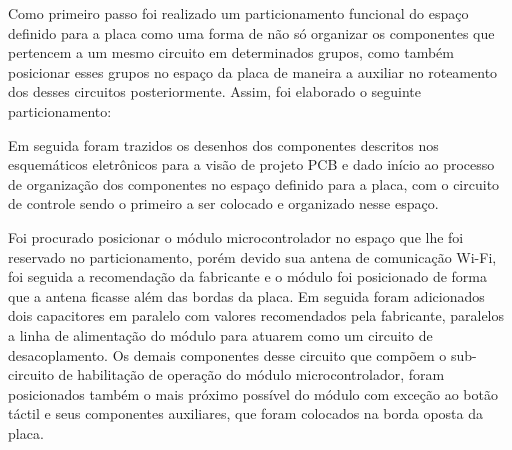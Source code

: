Como primeiro passo foi realizado um particionamento funcional do espaço definido para a placa como uma forma de não só organizar os componentes que pertencem a um mesmo circuito em determinados grupos, como também posicionar esses grupos no espaço da placa de maneira a auxiliar no roteamento dos desses circuitos posteriormente. Assim, foi elaborado o seguinte particionamento:


    \begin{figure}[h!]
            \captionsetup{width=16cm}
   \end{figure}


Em seguida foram trazidos os desenhos dos componentes descritos nos esquemáticos eletrônicos para a visão de projeto PCB e dado início ao processo de organização dos componentes no espaço definido para a placa, com o circuito de controle sendo o primeiro a ser colocado e organizado nesse espaço.

Foi procurado posicionar o módulo microcontrolador no espaço que lhe foi reservado no particionamento, porém devido sua antena de comunicação Wi-Fi, foi seguida a recomendação da fabricante e o módulo foi posicionado de forma que a antena ficasse além das bordas da placa. Em seguida foram adicionados dois capacitores em paralelo com valores recomendados pela fabricante, paralelos a linha de alimentação do módulo para atuarem como um circuito de desacoplamento. Os demais componentes desse circuito que compõem o sub-circuito de habilitação de operação do módulo microcontrolador, foram posicionados também o mais próximo possível do módulo com exceção ao botão táctil e seus componentes auxiliares, que foram colocados na borda oposta da placa.

